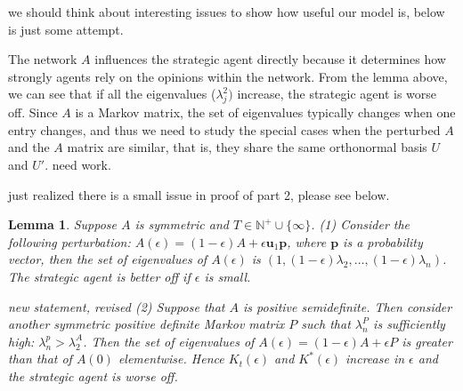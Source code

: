 \documentclass{article}
\newcommand{\ue}{\mathbf{u}}
\newtheorem{lemma}{Lemma}
\newcommand{\wl}[1]{{\color{blue} #1}}
\begin{document}
\wl{we should think about interesting issues to show how useful our model is, below is just some attempt}.

The network $A$ influences the strategic agent directly because it determines how strongly agents rely on the opinions within the network. From the lemma above, we can see that if all the eigenvalues ($\lambda_j^2)$ increase, the strategic agent is worse off. Since $A$ is a Markov matrix, the set of eigenvalues typically changes when one entry changes, and thus we need to study the special cases when the perturbed $A$ and the $A$ matrix are similar, that is, they share the same orthonormal basis $U$ and $U'$. \wl{need work.}



\wl{just realized there is a small issue in proof of part 2, please see below.}
\begin{lemma}
Suppose $A$ is symmetric and $T\in \mathbb{N}^+\cup \{\infty\}$.  (1) Consider the following perturbation: $A(\epsilon)=(1-\epsilon)A+\epsilon \ue_1\mathbf p$, where $\mathbf p$ is a probability vector, then the set of eigenvalues of $A(\epsilon)$ is $(1,(1-\epsilon)\lambda_2,\ldots,(1-\epsilon)\lambda_n)$. The strategic agent is better off if $	\epsilon$ is small. 

\wl{new statement, revised} %
(2) Suppose that $A$ is positive semidefinite. Then consider another symmetric positive definite Markov matrix $P$ such that $\lambda_n^P$ is sufficiently high: $\lambda_n^p> \lambda_2^A$. Then the set of eigenvalues of  $A(\epsilon)=(1-\epsilon)A+\epsilon P$ is greater than that of $A(0)$ elementwise. Hence $K_t(\epsilon)$ and $K^*(\epsilon)$ increase in $\epsilon$ and the strategic agent is worse off.

\end{lemma}
\end{document}
